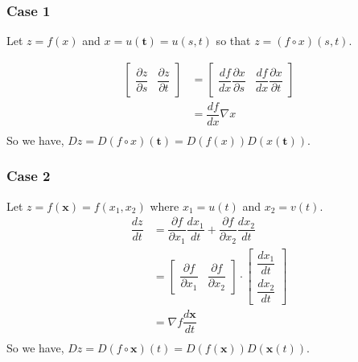 \documentclass{article}
\begin{document}
\subsubsection{Case 1}
Let $z=f(x)$ and $x=u(\mathbf{t})=u(s, t)$ so that $z = (f \circ x)(s,t)$.

\begin{align*}
    \begin{bmatrix}
        \dfrac{\partial z}{\partial s} &
        \dfrac{\partial z}{\partial t} 
    \end{bmatrix} &=
    \begin{bmatrix}
        \dfrac{df}{dx} \dfrac{\partial x}{\partial s} &
        \dfrac{df}{dx} \dfrac{\partial x}{\partial t}
    \end{bmatrix} \\
    &= \dfrac{df}{dx} \nabla x \\
\end{align*}
So we have, $Dz = D(f \circ x)(\mathbf{t}) =
D(f(x)) D(x(\mathbf{t}))$.

\subsubsection{Case 2}
Let $z= f(\mathbf{x}) =f(x_1, x_2)$ where $x_1=u(t)$ and $x_2=v(t)$.
\begin{align*}
    \dfrac{dz}{dt} &= \dfrac{\partial f}{\partial x_1} \dfrac{ d x_1}{dt} +
                     \dfrac{\partial f}{\partial x_2} \dfrac{ d x_2}{dt} \\
    &= \begin{bmatrix}
           \dfrac{\partial f}{\partial x_1} & \dfrac{\partial
           f}{\partial x_2}
       \end{bmatrix} \cdot
       \begin{bmatrix}
           \dfrac{d x_1}{dt} \\ \dfrac{d x_2}{dt}
       \end{bmatrix} \\
    &= \nabla f \dfrac{d\mathbf{x}}{dt} \\
\end{align*}
So we have, $Dz = D(f \circ \mathbf{x})(t) =
D(f(\mathbf{x}))D(\mathbf{x}(t))$.
\end{document}
